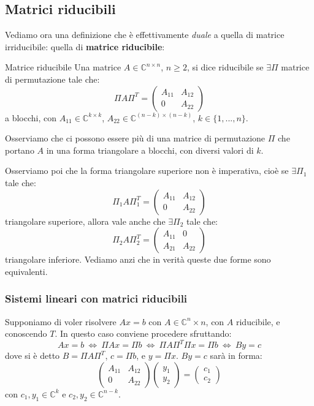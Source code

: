 \documentclass[a4paper,11pt]{article}
\begin{document}
\subsection{Matrici riducibili}
Vediamo ora una definizione che è effettivamente \textit{duale} a quella di matrice irriducibile: quella di \textbf{matrice riducibile}:
\begin{definition}{Matrice riducibile}
	Una matrice $A \in \mathbb{C}^{n \times n}$, $n \geq 2$, si dice riducibile se $\exists \Pi$ matrice di permutazione tale che:
	$$
	\Pi A \Pi^T = \begin{pmatrix}
		A_{11} & A_{12} \\
		0 & A_{22}
	\end{pmatrix}
	$$
	a blocchi, con $A_{11} \in \mathbb{C}^{k \times k}$, $A_{22} \in \mathbb{C}^{(n - k) \times (n - k)}$, $k \in \{ 1, ..., n \}$.
\end{definition}

Osserviamo che ci possono essere più di una matrice di permutazione $\Pi$ che portano $A$ in una forma triangolare a blocchi, con diversi valori di $k$.

Osserviamo poi che la forma triangolare superiore non è imperativa, cioè se $\exists \Pi_1$ tale che: 
$$\Pi_1 A \Pi_1^T = \begin{pmatrix}
	A_{11} & A_{12} \\
	0 & A_{22}
\end{pmatrix}$$
triangolare superiore, allora vale anche che $\exists \Pi_2$ tale che: 
$$\Pi_2 A \Pi_2^T = \begin{pmatrix}
	A_{11} & 0 \\
	A_{21} & A_{22}
\end{pmatrix}$$
triangolare inferiore.
Vediamo anzi che in verità queste due forme sono equivalenti.

\subsubsection{Sistemi lineari con matrici riducibili}
Supponiamo di voler risolvere $Ax = b$ con $A \in \mathbb{C}^n \times n$, con $A$ riducibile, e conoscendo $T$.
In questo caso conviene procedere sfruttando:
$$
Ax = b \ \Leftrightarrow \ \Pi A x = \Pi b \ \Leftrightarrow \ \Pi A \Pi^T \Pi x = \Pi b \ \Leftrightarrow \ By = c
$$
dove si è detto $B = \Pi A \Pi^T$, $c = \Pi b$, e $y = \Pi x$.
$By = c$ sarà in forma:
$$
\begin{pmatrix}
	A_{11} & A_{12} \\
	0 & A_{22}
\end{pmatrix}
\begin{pmatrix}
	y_1 \\ y_2
\end{pmatrix} =
\begin{pmatrix}
	c_1 \\
	c_2
\end{pmatrix}
$$
con $c_1, y_1 \in \mathbb{C}^k$ e $c_2, y_2 \in \mathbb{C}^{n - k}$.
\end{document}
